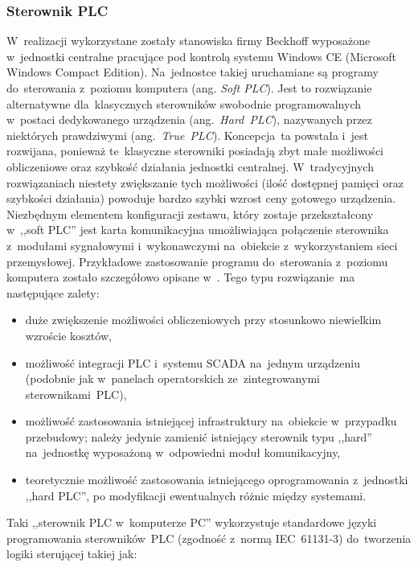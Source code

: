 \subsubsection{Sterownik PLC}
W~realizacji wykorzystane zostały stanowiska firmy Beckhoff wyposażone w~jednostki centralne pracujące pod kontrolą systemu Windows CE (Microsoft Windows Compact Edition). Na~jednostce takiej uruchamiane są programy do~sterowania z~poziomu komputera (ang. \textit{Soft PLC}). Jest to rozwiązanie alternatywne dla~klasycznych sterowników swobodnie programowalnych w~postaci dedykowanego urządzenia (ang.~\textit{Hard~PLC}), nazywanych przez niektórych prawdziwymi (ang.~\textit{True~PLC}).
Koncepcja~ta powstała i~jest rozwijana, ponieważ te~klasyczne sterowniki posiadają zbyt małe możliwości obliczeniowe oraz szybkość działania jednostki centralnej. W~tradycyjnych rozwiązaniach niestety zwiększanie tych możliwości (ilość dostępnej pamięci oraz szybkości działania) powoduje bardzo szybki wzrost ceny gotowego urządzenia.
Niezbędnym elementem konfiguracji zestawu, który zostaje przekształcony w~,,soft PLC'' jest karta komunikacyjna umożliwiająca połączenie sterownika z~modułami sygnałowymi i~wykonawczymi na~obiekcie z~wykorzystaniem sieci przemysłowej.
Przykładowe zastosowanie programu do~sterowania z~poziomu komputera zostało szczegółowo opisane w~\cite{art_softPLC}.
Tego typu rozwiązanie~ma następujące zalety:
\begin{itemize}
\item duże zwiększenie możliwości obliczeniowych przy stosunkowo niewielkim wzroście kosztów,
\item możliwość integracji PLC i~systemu SCADA na~jednym urządzeniu (podobnie jak w~panelach operatorskich ze~zintegrowanymi sterownikami~PLC),
\item możliwość zastosowania istniejącej infrastruktury na~obiekcie w~przypadku przebudowy; należy jedynie zamienić istniejący sterownik typu ,,hard'' na~jednostkę wyposażoną w~odpowiedni moduł komunikacyjny,
\item teoretycznie możliwość zastosowania istniejącego oprogramowania z~jednostki ,,hard PLC'', po modyfikacji ewentualnych różnic między systemami.
\end{itemize}
\clearpage
Taki ,,sterownik PLC w~komputerze PC'' wykorzystuje standardowe języki programowania sterowników~PLC (zgodność z~normą IEC~61131-3) do~tworzenia logiki sterującej takiej jak:

